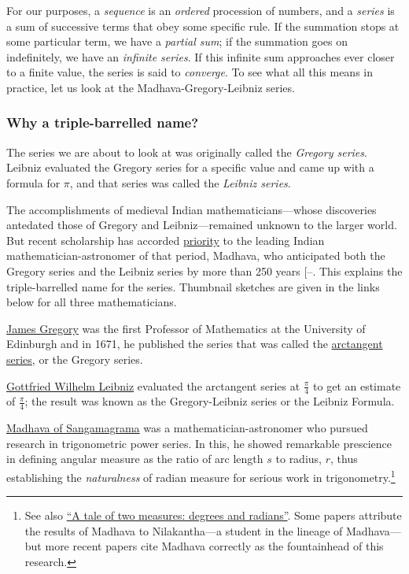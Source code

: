 \documentclass[
  a4paper,
]{article}
\begin{document}
For our purposes, a \emph{sequence} is an \emph{ordered} procession of
numbers, and a \emph{series} is a sum of successive terms that obey some
specific rule. If the summation stops at some particular term, we have a
\emph{partial sum}; if the summation goes on indefinitely, we have an
\emph{infinite series}. If this infinite sum approaches ever closer to a
finite value, the series is said to \emph{converge}. To see what all
this means in practice, let us look at the Madhava-Gregory-Leibniz
series.

\subsubsection{Why a triple-barrelled
name?}\label{why-a-triple-barrelled-name}

The series we are about to look at was originally called the
\emph{Gregory series}. Leibniz evaluated the Gregory series for a
specific value and came up with a formula for \(\pi\), and that series
was called the \emph{Leibniz series}.

The accomplishments of medieval Indian mathematicians---whose
discoveries antedated those of Gregory and Leibniz---remained unknown to
the larger world. But recent scholarship has accorded
\href{https://en.wikipedia.org/wiki/Scientific_priority}{priority} to
the leading Indian mathematician-astronomer of that period, Madhava, who
anticipated both the Gregory series and the Leibniz series by more than
250 years
{[}--\citeproc{ref-madhava-wiki}{21}{]}. This
explains the triple-barrelled name for the series. Thumbnail sketches
are given in the links below for all three mathematicians.

\href{https://en.wikipedia.org/wiki/James_Gregory_(mathematician)}{James
Gregory} was the first Professor of Mathematics at the University of
Edinburgh and in 1671, he published the series that was called the
\href{https://en.wikipedia.org/wiki/Arctangent_series}{arctangent
series}, or the Gregory series.

\href{https://www.google.com/search?q=Leibniz}{Gottfried Wilhelm
Leibniz} evaluated the arctangent series at \(\frac{\pi}{4}\) to get an
estimate of \(\frac{\pi}{4}\); the result was known as the
Gregory-Leibniz series or the Leibniz Formula.

\href{https://en.wikipedia.org/wiki/Madhava_of_Sangamagrama}{Madhava of
Sangamagrama} was a mathematician-astronomer who pursued research in
trigonometric power series. In this, he showed remarkable prescience in
defining angular measure as the ratio of arc length \(s\) to radius,
\(r\), thus establishing the \emph{naturalness} of radian measure for
serious work in trigonometry.\footnote{See also
  \href{https://swanlotus.netlify.app/blogs/a-tale-of-two-measures-degrees-and-radians}{``A
  tale of two measures: degrees and radians''}. Some papers attribute
  the results of Madhava to Nilakantha---a student in the lineage of
  Madhava---but more recent papers cite Madhava correctly as the
  fountainhead of this research.}
\end{document}
